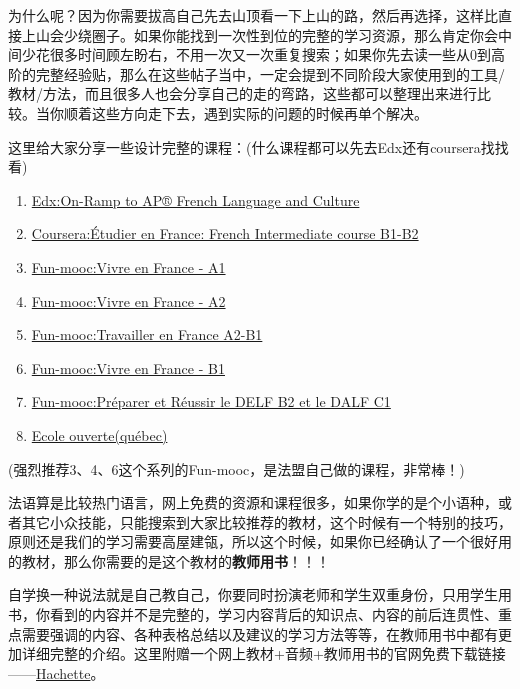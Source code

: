 \documentclass[
]{book}
\providecommand{\tightlist}{%
  \setlength{\itemsep}{0pt}\setlength{\parskip}{0pt}}
\begin{document}
为什么呢？因为你需要拔高自己先去山顶看一下上山的路，然后再选择，这样比直接上山会少绕圈子。如果你能找到一次性到位的完整的学习资源，那么肯定你会中间少花很多时间顾左盼右，不用一次又一次重复搜索；如果你先去读一些从0到高阶的完整经验贴，那么在这些帖子当中，一定会提到不同阶段大家使用到的工具/教材/方法，而且很多人也会分享自己的走的弯路，这些都可以整理出来进行比较。当你顺着这些方向走下去，遇到实际的问题的时候再单个解决。

这里给大家分享一些设计完整的课程：(什么课程都可以先去Edx还有coursera找找看)

\begin{enumerate}
\def\labelenumi{\arabic{enumi}.}
\tightlist
\item
  \href{https://learning.edx.org/course/course-v1:WestonHS+PFLC1x+2T2021/home}{Edx:On-Ramp to AP® French Language and Culture}
\item
  \href{https://www.coursera.org/learn/etudier-en-france}{Coursera:Étudier en France: French Intermediate course B1-B2}
\item
  \href{https://www.fun-mooc.fr/fr/cours/vivre-en-france-a1/}{Fun-mooc:Vivre en France - A1}
\item
  \href{https://www.fun-mooc.fr/fr/cours/vivre-en-france-a2/}{Fun-mooc:Vivre en France - A2}
\item
  \href{https://www.fun-mooc.fr/fr/cours/travailler-en-france-a2-b1/}{Fun-mooc:Travailler en France A2-B1}
\item
  \href{https://www.fun-mooc.fr/fr/cours/vivre-en-france-b1/}{Fun-mooc:Vivre en France - B1}
\item
  \href{https://www.fun-mooc.fr/fr/cours/preparer-et-reussir-le-delf-b2-et-le-dalf-c1/}{Fun-mooc:Préparer et Réussir le DELF B2 et le DALF C1}
\item
  \href{https://www.ecoleouverte.ca/accueil}{Ecole ouverte(québec)}
\end{enumerate}

(强烈推荐3、4、6这个系列的Fun-mooc，是法盟自己做的课程，非常棒！)

法语算是比较热门语言，网上免费的资源和课程很多，如果你学的是个小语种，或者其它小众技能，只能搜索到大家比较推荐的教材，这个时候有一个特别的技巧，原则还是我们的学习需要高屋建瓴，所以这个时候，如果你已经确认了一个很好用的教材，那么你需要的是这个教材的\textbf{教师用书}！！！

自学换一种说法就是自己教自己，你要同时扮演老师和学生双重身份，只用学生用书，你看到的内容并不是完整的，学习内容背后的知识点、内容的前后连贯性、重点需要强调的内容、各种表格总结以及建议的学习方法等等，在教师用书中都有更加详细完整的介绍。这里附赠一个网上教材+音频+教师用书的官网免费下载链接------\href{https://www.hachettefle.com/numerique/ressources}{Hachette}。
\end{document}
